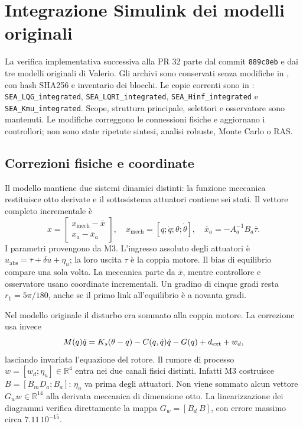 \section{Integrazione Simulink dei modelli originali}
\label{sec:simulink-integration}
La verifica implementativa successiva alla PR 32 parte dal commit
\texttt{889c0eb} e dai tre modelli originali di Valerio. Gli archivi sono
conservati senza modifiche in , con hash SHA256
e inventario dei blocchi. Le copie correnti sono in :
\texttt{SEA\_LQG\_integrated}, \texttt{SEA\_LQRI\_integrated},
\texttt{SEA\_Hinf\_integrated} e \texttt{SEA\_Kmu\_integrated}.
Scope, struttura principale, selettori e osservatore sono mantenuti.
Le modifiche correggono le connessioni fisiche e aggiornano i controllori;
non sono state ripetute sintesi, analisi robuste, Monte Carlo o RAS.

\subsection{Correzioni fisiche e coordinate}
Il modello mantiene due sistemi dinamici distinti: la funzione meccanica
restituisce otto derivate e il sottosistema attuatori contiene sei stati.
Il vettore completo incrementale è
\[
 x=\begin{bmatrix}x_{\mathrm{mech}}-\bar x\\x_a-\bar x_a\end{bmatrix},
 \quad x_{\mathrm{mech}}=[q;\dot q;\theta;\dot\theta],\quad
 \bar x_a=-A_a^{-1}B_a\bar\tau.
\]
I parametri provengono da M3. L'ingresso assoluto degli attuatori è
$u_{\mathrm{abs}}=\bar\tau+\delta u+\eta_u$; la loro uscita $\tau$ è la
coppia motore. Il bias di equilibrio compare una sola volta.
La meccanica parte da $\bar x$, mentre controllore e osservatore usano
coordinate incrementali. Un gradino di cinque gradi resta
$r_1=5\pi/180$, anche se il primo link all'equilibrio è a novanta gradi.

Nel modello originale il disturbo era sommato alla coppia motore.
La correzione usa invece
\[
 M(q)\ddot q=K_s(\theta-q)-C(q,\dot q)\dot q-G(q)+d_{\rm ext}+w_d,
\]
lasciando invariata l'equazione del rotore. Il rumore di processo
$w=[w_d;\eta_u]\in\mathbb R^4$ entra nei due canali fisici distinti.
Infatti M3 costruisce $B=[B_mD_a;B_a]$: $\eta_u$ va prima degli attuatori.
Non viene sommato alcun vettore $G_ww\in\mathbb R^{14}$ alla derivata
meccanica di dimensione otto.
La linearizzazione dei diagrammi verifica direttamente la mappa
$G_w=[B_d\ B]$, con errore massimo circa $7.11\,10^{-15}$.

